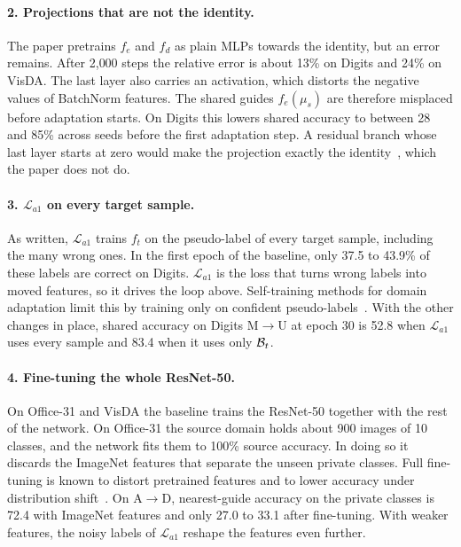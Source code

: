 \paragraph{2. Projections that are not the identity.}
The paper pretrains $f_e$ and $f_d$ as plain MLPs towards the identity, but an error remains.
After 2{,}000 steps the relative error is about 13\% on Digits and 24\% on VisDA.
The last layer also carries an activation, which distorts the negative values of BatchNorm features.
The shared guides $f_e(\mu_s)$ are therefore misplaced before adaptation starts.
On Digits this lowers shared accuracy to between 28 and 85\% across seeds before the first adaptation step.
A residual branch whose last layer starts at zero would make the projection exactly the identity~\citep{zhang2019fixup}, which the paper does not do.

\paragraph{3. $\mathcal{L}_{a1}$ on every target sample.}
As written, $\mathcal{L}_{a1}$ trains $f_t$ on the pseudo-label of every target sample, including the many wrong ones.
In the first epoch of the baseline, only 37.5 to 43.9\% of these labels are correct on Digits.
$\mathcal{L}_{a1}$ is the loss that turns wrong labels into moved features, so it drives the loop above.
Self-training methods for domain adaptation limit this by training only on confident pseudo-labels~\citep{zou2018cbst}.
With the other changes in place, shared accuracy on Digits M$\to$U at epoch 30 is 52.8 when $\mathcal{L}_{a1}$ uses every sample and 83.4 when it uses only $\mathcal{B}_t$.

\paragraph{4. Fine-tuning the whole ResNet-50.}
On Office-31 and VisDA the baseline trains the ResNet-50 together with the rest of the network.
On Office-31 the source domain holds about 900 images of 10 classes, and the network fits them to 100\% source accuracy.
In doing so it discards the ImageNet features that separate the unseen private classes.
Full fine-tuning is known to distort pretrained features and to lower accuracy under distribution shift~\citep{kumar2022finetuning}.
On A$\to$D, nearest-guide accuracy on the private classes is 72.4 with ImageNet features and only 27.0 to 33.1 after fine-tuning.
With weaker features, the noisy labels of $\mathcal{L}_{a1}$ reshape the features even further.

